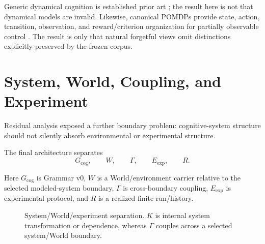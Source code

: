 \documentclass[11pt]{article}
\newcommand{\Pin}{P_{\mathrm{in}}}
\newcommand{\Pout}{P_{\mathrm{out}}}
\newcommand{\Gsys}{G_{\mathrm{cog}}}
\newcommand{\World}{W}
\newcommand{\Coupling}{\Gamma}
\newcommand{\Experiment}{E_{\mathrm{exp}}}
\begin{document}
Generic dynamical cognition is established prior art \citep{VanGelder1998DynamicalHypothesis}; the result here is not that dynamical models are invalid. Likewise, canonical POMDPs provide state, action, transition, observation, and reward/criterion organization for partially observable control \citep{KaelblingLittmanCassandra1998POMDP}. The result is only that natural forgetful views omit distinctions explicitly preserved by the frozen corpus.

\section{System, World, Coupling, and Experiment}

Residual analysis exposed a further boundary problem: cognitive-system structure should not silently absorb environmental or experimental structure.

The final architecture separates
\[
\Gsys,
\qquad
\World,
\qquad
\Coupling,
\qquad
\Experiment,
\qquad
R.
\]

Here \(\Gsys\) is Grammar v0, \(\World\) is a World/environment carrier relative to the selected modeled-system boundary, \(\Coupling\) is cross-boundary coupling, \(\Experiment\) is experimental protocol, and \(R\) is a realized finite run/history.

\begin{figure}[htbp]
\centering
{}
\caption{System/World/experiment separation. \(K\) is internal system transformation or dependence, whereas \(\Gamma\) couples across a selected system/World boundary.}
\label{fig:world}
\end{figure}
\end{document}
